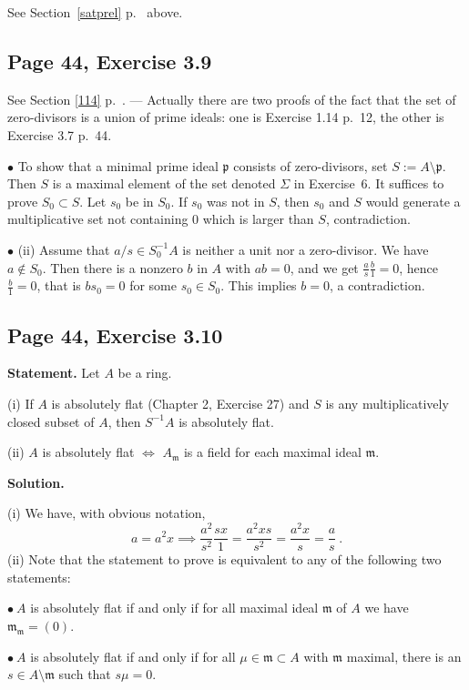 \documentclass[parskip=half,fontsize=12pt]{scrartcl}%
\newcommand{\mf}{\mathfrak}
\newcommand{\mmm}{\mf m}
\newcommand{\ppp}{\mf p}
\newcommand{\bu}{\bullet}
\begin{document}
See Section~\ref{satprel} p.~\pageref{satprel} above.

\subsection{Page 44, Exercise 3.9}%

See Section \ref{114} p.~\pageref{114}. --- Actually there are two proofs of the fact that the set of zero-divisors  is a union of prime ideals: one is Exercise 1.14 p.~12, the other is Exercise 3.7 p.~44.

$\bu$ To show that a minimal prime ideal $\ppp$ consists of zero-divisors, set $S:=A\setminus\ppp$. Then $S$ is a maximal element of the set denoted $\Sigma$ in Exercise~6. It suffices to prove $S_0\subset S$. Let $s_0$ be in $S_0$. If $s_0$ was not in $S$, then $s_0$ and $S$ would generate a multiplicative set not containing $0$ which is larger than $S$, contradiction. 

$\bu$ (ii) Assume that $a/s\in S_0^{-1}A$ is neither a unit nor a zero-divisor. We have $a\notin S_0$. Then there is a nonzero $b$ in $A$ with $ab=0$, and we get $\frac as\frac b1=0$, hence $\frac b1=0$, that is $bs_0=0$ for some $s_0\in S_0$. This implies $b=0$, a contradiction.

\subsection{Page 44, Exercise 3.10}\label{310}%

\textbf{Statement.} Let $A$ be a ring.

(i) If $A$ is absolutely flat (Chapter 2, Exercise 27) and $S$ is any multiplicatively 
closed subset of $A$, then $S^{-1}A$ is absolutely flat.

(ii) $A$ is absolutely flat $\iff$ $A_\mmm$ is a field for each maximal ideal $\mmm$.

\textbf{Solution.}

(i) We have, with obvious notation, 
$$
a=a^2x\implies\frac{a^2}{s^2}\frac{sx}1=\frac{a^2xs}{s^2}=\frac{a^2x}s=\frac as\ .
$$ 
(ii) Note that the statement to prove is equivalent to any of the following two statements:

$\bu\ A$ is absolutely flat if and only if for all maximal ideal $\mmm$ of $A$ we have $\mmm_\mmm=(0)$.

$\bu\ A$ is absolutely flat if and only if for all $\mu\in\mmm\subset A$ with $\mmm$ maximal, there is an $s\in A\setminus\mmm$ such that $s\mu=0$. 
\end{document}

